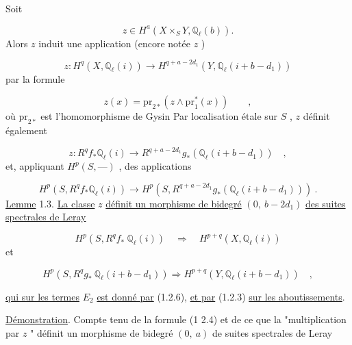 Soit

\begin{equation}\tag{1.2.2}
z \in H^a(X \times_S Y, \mathbb{Q}_\ell(b)).
\end{equation}
Alors $z$ induit une application (encore notée $z$ )

\begin{equation}\tag{1.2.3}
z : H^q(X, \mathbb{Q}_\ell(i)) \longrightarrow H^{q+a-2d_1} (Y, \mathbb{Q}_\ell(i+b-d_1))
\end{equation}
par la formule

\begin{equation}\tag{1.2.4}
z(x) = \mathrm{pr}_{2*}(z \wedge \mathrm{pr}_1^* (x)) \qquad ,
\end{equation}
où $\mathrm{pr}_{2*}$ est l'homomorphisme de Gysin  Par localisation étale sur $S$ , $z$ définit également

\begin{equation}\tag{1.2.5}
z : R^q f_* \mathbb{Q}_\ell(i) \longrightarrow R^{q+a-2d_1} g_* (\mathbb{Q}_\ell(i+b-d_1)) \quad ,
\end{equation}
et, appliquant $H^p(S, \text{---} )$ , des applications

\begin{equation}\tag{1 2.6}
H^p(S, R^q f_* \mathbb{Q}_\ell(i)) \longrightarrow H^p(S, R^{q+a-2d_1} g_*(\mathbb{Q}_\ell(i+b-d_1))) \ .
\end{equation}
\underline{Lemme} 1.3.  \underline{La classe}  $z$  \underline{définit un morphisme de bidegré} $(0,\ b-2d_1)$ \underline{des suites spectrales de Leray}

\begin{equation}\tag{1.2.7}
H^p(S, R^q f_* \ \mathbb{Q}_\ell(i)) \quad \Rightarrow \quad H^{p+q}(X, \mathbb{Q}_\ell(i))
\end{equation}
et

\begin{equation}\tag{1 2.8}
H^p(S, R^q g_* \ \mathbb{Q}_\ell(i+b-d_1)) \Rightarrow H^{p+q}(Y, \mathbb{Q}_\ell(i+b-d_1)) \quad , 
\end{equation}


 \underline{qui sur les termes} $E_2$ \underline{est donné par} (1.2.6), \underline{et par} (1.2.3) \underline{sur les aboutissements}.

\underline{Démonstration}. Compte tenu de la formule (1 2.4) et de ce que la "multiplication par $z$ " définit un morphisme de bidegré $(0,\ a)$ de suites spectrales de Leray

